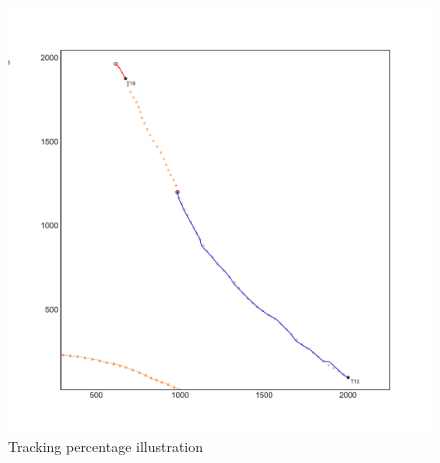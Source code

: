 \begin{figure}[H]
\centering
\includegraphics[width = .8\textwidth]{Figures/track_percentage_illustration.pdf}
\caption{Tracking percentage illustration}\label{fig:track_percentage}
\end{figure}

